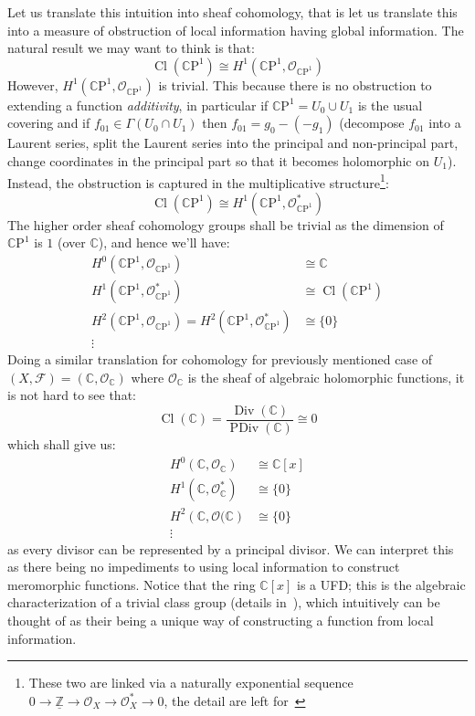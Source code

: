 \documentclass{ut-thesis}
\newcommand{\Z}{{\mathbb{Z}}}
\newcommand{\C}{{\mathbb{C}}}
\newcommand{\CF}{{\mathcal{F}}}
\newcommand{\CO}{{\mathcal{O}}}
\newcommand{\CP}{{\mathbb{C}\mathrm{P}}}
\newcommand{\Div}{{\operatorname{Div}}}
\newcommand{\PDiv}{{\operatorname{PDiv}}}
\newcommand{\Cl}{{\operatorname{Cl}}}
\begin{document}
Let us translate this intuition into sheaf cohomology, that is let us translate this into a measure of
obstruction of local information having global information. The natural result we may want to think is that:
\[
  \Cl(\CP^1) \cong H^1(\CP^1, \CO_{\CP^1})
\]
However, $H^1(\CP^1, \CO_{\CP^1})$ is trivial. This because there is no obstruction to extending a function
\emph{additivity}, in particular if $\CP^1 = U_0 \cup U_1$ is the usual covering and if $f_{01} \in
\Gamma(U_0\cap U_1)$ then $f_{01} = g_0 - (-g_1)$ (decompose $f_{01}$ into a Laurent series, split the Laurent
series into the principal and non-principal part, change coordinates in the principal part so that it becomes
holomorphic on $U_1$). Instead, the obstruction is captured in the multiplicative structure\footnote{These
 two are linked via a naturally exponential sequence $0 \to \underline{\Z} \to \CO_X \to \CO_X^* \to 0$, the detail are
left for~\cite{NateAlgGeo}}:
\[
  \Cl(\CP^1) \cong H^1(\CP^1, \CO_{\CP^1}^*)
\]
The
higher order sheaf cohomology groups shall be trivial as the dimension of $\CP^1$ is $1$ (over $\C$), and
hence we'll have:
\begin{align*}
  H^0(\CP^1, \CO_{\CP^1}) &\cong \C\\
  H^1(\CP^1, \CO_{\CP^1}^*) &\cong \Cl(\CP^1)\\
  H^2(\CP^1, \CO_{\CP^1}) = H^2(\CP^1, \CO_{\CP^1}^*)&\cong \{0\}\\
  \vdots
\end{align*}
Doing a similar translation for cohomology for previously mentioned case of $(X, \CF) = (\C, \CO_\C)$ where
$\CO_\C$ is the sheaf of algebraic holomorphic functions, it is not hard to see that:
\[
  \Cl(\C) = \frac{\Div(\C)}{\PDiv(\C)} \cong 0
\]
which shall give us:
\begin{align*}
  H^0(\C, \CO_{\C}) &\cong \C[x]\\
  H^1(\C, \CO_{\C}^*) &\cong \{0\}\\
  H^2(\C, \CO{(\C}) &\cong \{0\}\\
  \vdots
\end{align*}
as every divisor can be represented by a principal divisor. We can interpret this as there being no
impediments to using local information to construct meromorphic functions. Notice that the ring $\C[x]$ is
a UFD; this is the algebraic characterization of a trivial class group (details in~\cite{NateAlgGeo}), which
intuitively can be thought of as their being a unique way of constructing a function from local
information.
\end{document}
